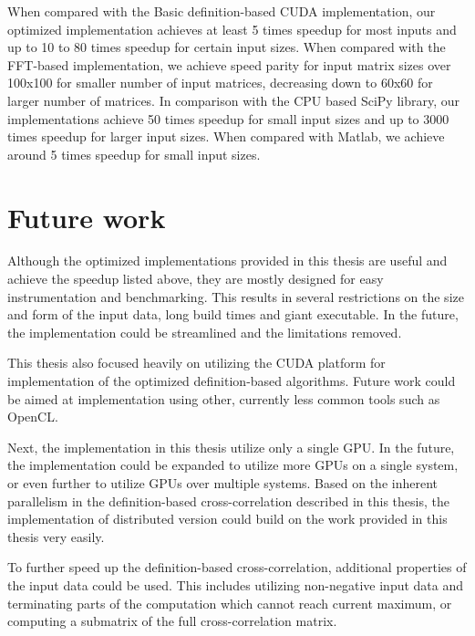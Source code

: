 When compared with the Basic definition-based CUDA implementation, our optimized implementation achieves at least 5 times speedup for most inputs and up to 10 to 80 times speedup for certain input sizes. When compared with the FFT-based implementation, we achieve speed parity for input matrix sizes over 100x100 for smaller number of input matrices, decreasing down to 60x60 for larger number of matrices. In comparison with the CPU based SciPy library, our implementations achieve 50 times speedup for small input sizes and up to 3000 times speedup for larger input sizes. When compared with Matlab, we achieve around 5 times speedup for small input sizes.
 


\section{Future work}
Although the optimized implementations provided in this thesis are useful and achieve the speedup listed above, they are mostly designed for easy instrumentation and benchmarking. This results in several restrictions on the size and form of the input data, long build times and giant executable. In the future, the implementation could be streamlined and the limitations removed.

This thesis also focused heavily on utilizing the CUDA platform for implementation of the optimized definition-based algorithms. Future work could be aimed at implementation using other, currently less common tools such as OpenCL. 

Next, the implementation in this thesis utilize only a single GPU. In the future, the implementation could be expanded to utilize more GPUs on a single system, or even further to utilize GPUs over multiple systems. Based on the inherent parallelism in the definition-based cross-correlation described in this thesis, the  implementation of distributed version could build on the work provided in this thesis very easily.

To further speed up the definition-based cross-correlation, additional properties of the input data could be used. This includes utilizing non-negative input data and terminating parts of the computation which cannot reach current maximum, or computing a submatrix of the full cross-correlation matrix.